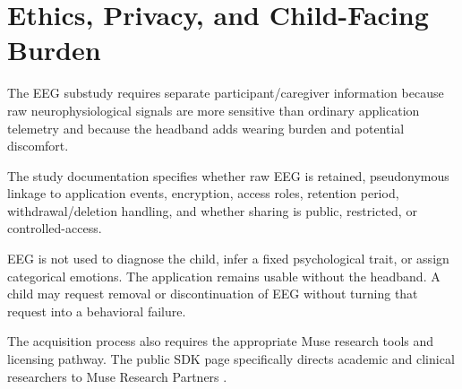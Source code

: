 \section{Ethics, Privacy, and Child-Facing Burden}

The EEG substudy requires separate participant/caregiver information because raw neurophysiological signals are more sensitive than ordinary application telemetry and because the headband adds wearing burden and potential discomfort.

The study documentation specifies whether raw EEG is retained, pseudonymous linkage to application events, encryption, access roles, retention period, withdrawal/deletion handling, and whether sharing is public, restricted, or controlled-access.

EEG is not used to diagnose the child, infer a fixed psychological trait, or assign categorical emotions. The application remains usable without the headband. A child may request removal or discontinuation of EEG without turning that request into a behavioral failure.

The acquisition process also requires the appropriate Muse research tools and licensing pathway. The public SDK page specifically directs academic and clinical researchers to Muse Research Partners \parencite{interaxonDevelopers2026}.
